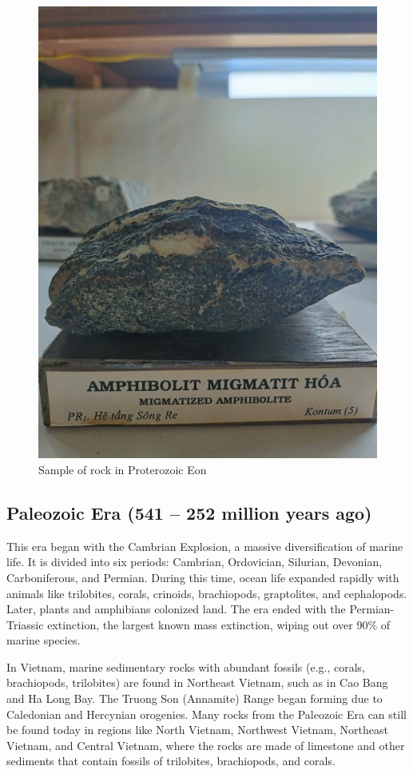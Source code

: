 \begin{figure}[H]
  \centering
  \includegraphics[max width=0.8\linewidth]{graphics/figure_03.jpg}
  \caption{Sample of rock in Proterozoic Eon}
  \label{fig:proterozoic-rock}
\end{figure}

\subsection{Paleozoic Era (541 – 252 million years ago)}
\label{subsec:paleozoic}

This era began with the Cambrian Explosion, a massive diversification of marine life. It is divided into six periods: Cambrian, Ordovician, Silurian, Devonian, Carboniferous, and Permian. During this time, ocean life expanded rapidly with animals like trilobites, corals, crinoids, brachiopods, graptolites, and cephalopods. Later, plants and amphibians colonized land. The era ended with the Permian-Triassic extinction, the largest known mass extinction, wiping out over 90\% of marine species.

In Vietnam, marine sedimentary rocks with abundant fossils (e.g., corals, brachiopods, trilobites) are found in Northeast Vietnam, such as in Cao Bang and Ha Long Bay. The Truong Son (Annamite) Range began forming due to Caledonian and Hercynian orogenies. Many rocks from the Paleozoic Era can still be found today in regions like North Vietnam, Northwest Vietnam, Northeast Vietnam, and Central Vietnam, where the rocks are made of limestone and other sediments that contain fossils of trilobites, brachiopods, and corals.

